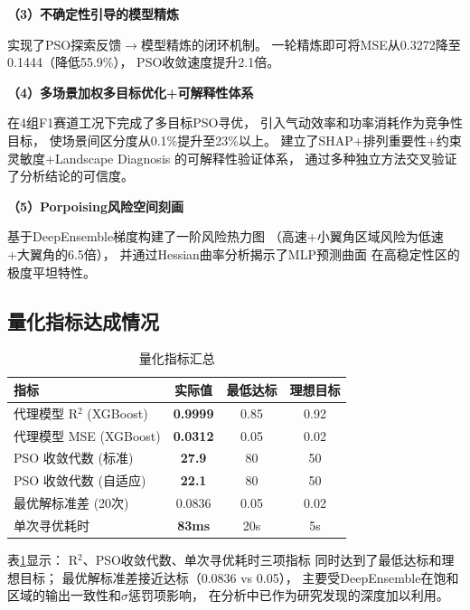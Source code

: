 \vspace{0.3cm}

\noindent
\textbf{（3）不确定性引导的模型精炼}

实现了PSO探索反馈$\to$模型精炼的闭环机制。
一轮精炼即可将MSE从0.3272降至0.1444（降低55.9\%），
PSO收敛速度提升2.1倍。

\vspace{0.3cm}

\noindent
\textbf{（4）多场景加权多目标优化+可解释性体系}

在4组F1赛道工况下完成了多目标PSO寻优，
引入气动效率和功率消耗作为竞争性目标，
使场景间区分度从0.1\%提升至23\%以上。
建立了SHAP+排列重要性+约束灵敏度+Landscape Diagnosis
的可解释性验证体系，
通过多种独立方法交叉验证了分析结论的可信度。

\vspace{0.3cm}

\noindent
\textbf{（5）Porpoising风险空间刻画}

基于DeepEnsemble梯度构建了一阶风险热力图
（高速+小翼角区域风险为低速+大翼角的6.5倍），
并通过Hessian曲率分析揭示了MLP预测曲面
在高稳定性区的极度平坦特性。

\subsection{量化指标达成情况}

\begin{table}[H]
\centering
\caption{量化指标汇总}
\begin{tabular}{lccc}
\toprule
指标 & 实际值 & 最低达标 & 理想目标 \\
\midrule
代理模型 R$^2$ (XGBoost) & \textbf{0.9999} & 0.85 & 0.92 \\
代理模型 MSE (XGBoost) & \textbf{0.0312} & 0.05 & 0.02 \\
PSO 收敛代数 (标准) & \textbf{27.9} & 80 & 50 \\
PSO 收敛代数 (自适应) & \textbf{22.1} & 80 & 50 \\
最优解标准差 (20次) & 0.0836 & 0.05 & 0.02 \\
单次寻优耗时 & \textbf{83ms} & 20s & 5s \\
\bottomrule
\end{tabular}
\label{tab:quantitative}
\end{table}

表\ref{tab:quantitative}显示：
R$^2$、PSO收敛代数、单次寻优耗时三项指标
同时达到了最低达标和理想目标；
最优解标准差接近达标（0.0836 vs 0.05），
主要受DeepEnsemble在饱和区域的输出一致性和$\sigma$惩罚项影响，
在分析中已作为研究发现的深度加以利用。

